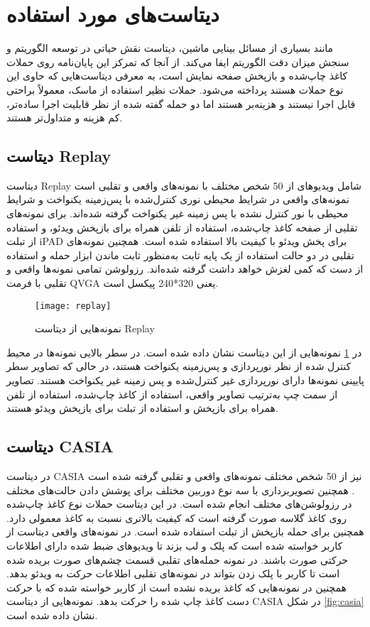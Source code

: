   \section{دیتاست‌های مورد استفاده}
  مانند بسیاری از مسائل بینایی ماشین، دیتاست نقش حیاتی در توسعه الگوریتم و سنجش میزان دقت الگوریتم ایفا می‌کند. از آنجا که تمرکز این پایان‌نامه روی حملات کاغذ چاپ‌شده و بازپخش صفحه نمایش است، به معرفی دیتاست‌هایی که حاوی این نوع حملات هستند پرداخته می‌شود. حملات نظیر استفاده از ماسک، معمولاً براحتی قابل اجرا نیستند و هزینه‌بر هستند اما دو حمله گفته شده از نظر قابلیت اجرا ساده‌تر، کم هزینه و متداول‌تر هستند. 
\subsection{دیتاست Replay}
دیتاست Replay شامل ویدیوهای از 50 شخص مختلف با نمونه‌های واقعی و تقلبی است
\cite{chingovska2012effectiveness}
 نمونه‌های واقعی در شرایط محیطی نوری کنترل‌شده با پس‌زمینه یکنواخت و شرایط محیطی با نور کنترل نشده با پس زمینه غیر یکنواخت گرفته شده‌اند. برای نمونه‌های تقلبی از صفحه کاغذ چاپ‌شده، استفاده از تلفن همراه برای بازپخش ویدئو، و استفاده از تبلت iPAD برای پخش ویدئو با کیفیت بالا استفاده شده است. همچنین نمونه‌های تقلبی در دو حالت استفاده از یک پایه ثابت به‌منظور ثابت ماندن ابزار حمله و استفاده از دست که کمی لغزش خواهد داشت گرفته شده‌اند. رزولوشن تمامی نمونه‌ها واقعی و تقلبی با فرمت QVGA یعنی 320*240 پیکسل است.
  \begin{figure}[h]
 	\centerline{\texttt{[image: replay]}}
 	\caption{نمونه‌هایی از دیتاست Replay \cite{chingovska2012effectiveness} }
 	\label{fig:replay}
 \end{figure}
در
\ref{fig:replay}
نمونه‌هایی از این دیتاست نشان داده شده است. در سطر بالایی نمونه‌ها در محیط کنترل شده از نظر نورپردازی و پس‌زمینه یکنواخت هستند، در حالی که تصاویر سطر پایینی نمونه‌ها دارای نورپردازی غیر کنترل‌شده و پس زمینه غیر یکنواخت هستند. تصاویر از سمت چپ به‌ترتیب تصاویر واقعی، استفاده از کاغذ چاپ‌شده، استفاده از تلفن همراه برای بازپخش و استفاده از تبلت برای بازپخش ویدئو هستند.
\subsection{دیتاست CASIA}
در دیتاست CASIA نیز از 50 شخص مختلف نمونه‌های واقعی و تقلبی گرفته شده است 
\cite{zhang2012face}
. همچنین تصویربرداری با سه نوع دوربین مختلف برای پوشش دادن حالت‌های مختلف در رزولوشن‌های مختلف انجام شده است. در این دیتاست حملات نوع کاغذ چاپ‌شده روی کاغذ گلاسه صورت گرفته است که کیفیت بالاتری نسبت به کاغذ معمولی دارد. همچنین برای حمله بازپخش از تبلت استفاده شده است. در نمونه‌های واقعی دیتاست از کاربر خواسته شده است که پلک و لب بزند تا ویدیوهای ضبط شده دارای اطلاعات حرکتی صورت باشند. در نمونه حمله‌های تقلبی قسمت چشم‌های صورت بریده شده است تا کاربر با پلک زدن بتواند در نمونه‌های تقلبی اطلاعات حرکت به ویدئو بدهد. همچنین در نمونه‌هایی که کاغذ بریده نشده است از کاربر خواسته شده که با حرکت دست کاغذ چاپ شده را حرکت بدهد. نمونه‌هایی از دیتاست CASIA در شکل 
\ref{fig:casia}
نشان داده شده است.

